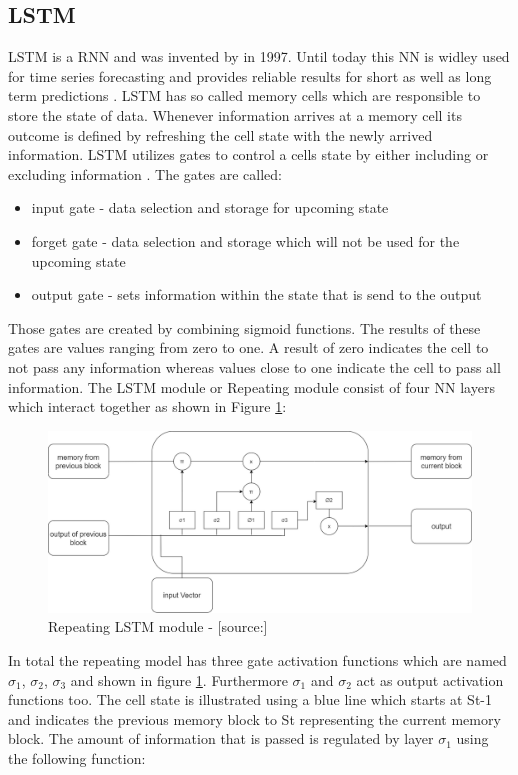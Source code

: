 \subsection{LSTM}
\label{sec:lstm}
LSTM is a RNN and was invented by \cite{lstm_inventor} in 1997. Until today this NN is widley used for time series forecasting and provides reliable results for short as well as long term predictions \cite{rnn_moharm}. LSTM has so called memory cells which are responsible to store the state of data. Whenever information arrives at a memory cell its outcome is defined by refreshing the cell state with the newly arrived information. LSTM utilizes gates to control a cells state by either including or excluding information \cite{lstm_stock}. The gates are called: 
\begin{itemize}
\item input gate - data selection and storage for upcoming state
\item forget gate - data selection and storage which will not be used for the upcoming state
\item output gate - sets information within the state that is send to the output
\end{itemize}
Those gates are created by combining sigmoid functions. The results of these gates are values ranging from zero to one. A result of zero indicates the cell to not pass any information whereas values close to one indicate the cell to pass all information. 
The LSTM module or Repeating module consist of four NN layers which interact together as shown in Figure \ref{fig:lstm_rep_model}:
\begin{figure}[H]
	\centering
		\includegraphics[width=14cm]{images/lstm_module}
	\caption{Repeating LSTM module - [source:\cite{lstm_module}]}
	\label{fig:lstm_rep_model}
\end{figure}
In total the repeating model has three gate activation functions which are named $\sigma_1$, $\sigma_2$,  $\sigma_3$ and shown in figure \ref{fig:lstm_rep_model}. Furthermore $\sigma_1$ and $\sigma_2$ act as output activation functions too. The cell state is illustrated using a blue line which starts at St-1 and indicates the previous memory block to St representing the current memory block. The amount of information that is passed is regulated by layer  $\sigma_1$ using the following function:
